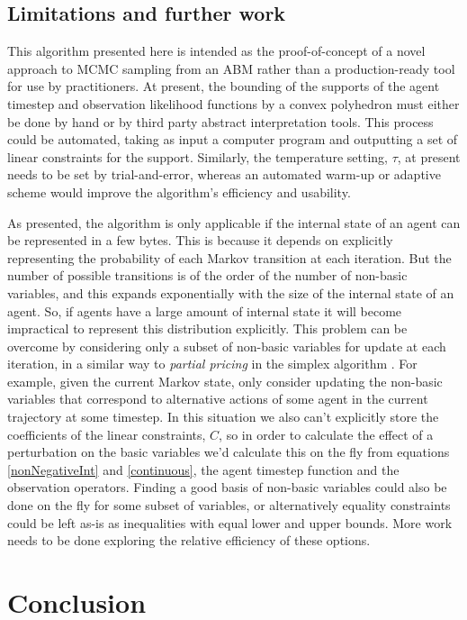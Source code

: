 \documentclass{article}
\begin{document}
\subsection{Limitations and further work}

This algorithm presented here is intended as the proof-of-concept of a novel approach to MCMC sampling from an ABM rather than a production-ready tool for use by practitioners. At present, the bounding of the supports of the agent timestep and observation likelihood functions by a convex polyhedron must either be done by hand or by third party abstract interpretation tools. This process could be automated, taking as input a computer program and outputting a set of linear constraints for the support. Similarly, the temperature setting, $\tau$, at present needs to be set by trial-and-error, whereas an automated warm-up or adaptive scheme would improve the algorithm's efficiency and usability.

As presented, the algorithm is only applicable if the internal state of an agent can be represented in a few bytes. This is because it depends on explicitly representing the probability of each Markov transition at each iteration. But the number of possible transitions is of the order of the number of non-basic variables, and this expands exponentially with the size of the internal state of an agent. So, if agents have a large amount of internal state it will become impractical to represent this distribution explicitly. This problem can be overcome by considering only a subset of non-basic variables for update at each iteration, in a similar way to \textit{partial pricing} in the simplex algorithm \citep{maros2002computational}. For example, given the current Markov state, only consider updating the non-basic variables that correspond to alternative actions of some agent in the current trajectory at some timestep. In this situation we also can't explicitly store the coefficients of the linear constraints, $C$, so in order to calculate the effect of a perturbation on the basic variables we'd calculate this on the fly from equations \eqref{nonNegativeInt} and \eqref{continuous}, the agent timestep function and the observation operators. Finding a good basis of non-basic variables could also be done on the fly for some subset of variables, or alternatively equality constraints could be left as-is as inequalities with equal lower and upper bounds. More work needs to be done exploring the relative efficiency of these options.

\section{Conclusion}
\end{document}
